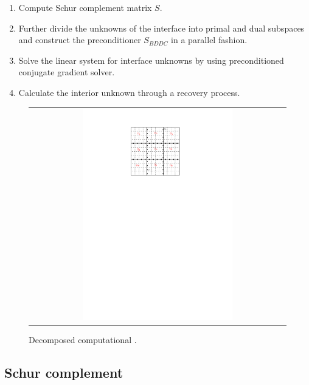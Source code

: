 \begin{enumerate}
	\item	Compute Schur complement matrix $ S $.
	\item	Further divide the unknowns of the interface into primal and dual subspaces and construct the preconditioner $ S_{BDDC} $ in a parallel fashion.
	\item	Solve the linear system for interface unknowns by using preconditioned conjugate gradient solver.
	\item Calculate the interior unknown through a recovery process.
\end{enumerate}


\begin{figure}[h]
	\centering
	\begin{tabular}{c}
		\includegraphics[width=0.6\textwidth]{./pics/domain2.pdf}
	\end{tabular}
	\caption{\footnotesize Decomposed computational .}\label{fig4: domain1}
\end{figure}


\subsection{Schur complement}


